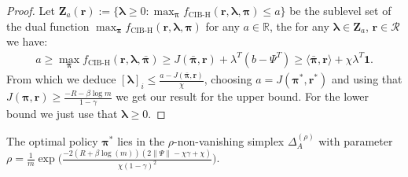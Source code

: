 \begin{proof}
    Let $\bm{Z}_a(\bm{r}) := \{ \bm{\lambda} \geq 0 : \max_{\bm{\pi}}f_\text{CIB-H}(\bm{r},\bm{\lambda},\bm{\pi}) \leq a \}$ be the sublevel set of the dual function $\max_{\bm{\pi}}f_\text{CIB-H}(\bm{r},\bm{\lambda},\bm{\pi})$ for any $a \in \mathbb{R}$, the for any $\bm{\lambda} \in \bm{Z}_a$, $\bm{r} \in \mathcal{R}$ we have:
    \begin{align*}
        a \geq \max_{\bm{\pi}}f_\text{CIB-H}(\bm{r},\bm{\lambda},\bar{\bm{\pi}}) \geq J( \bar{\bm{\pi}},\bm{r}) + \lambda^T (b - \Psi^T) \geq \langle \bar{\bm{\pi}},\bm{r}\rangle + \chi \lambda^T \mathbf{1}.
    \end{align*}
    From which we deduce $[\bm{\lambda}]_i \leq \frac{a-J( \bar{\bm{\pi}},\bm{r})}{\chi}$, choosing $a=J(\bm{\pi}^*,\bm{r}^*)$ and using that $J(\bm{\pi},\bm{r}) \geq \frac{-R -\beta \log m}{1-\gamma}$ we get our result for the upper bound. For the lower bound we just use that $\bm{\lambda} \geq 0$.
\end{proof}



\begin{proposition}
    \label{prop:optimal_solution_in_simplex} The optimal policy $\bm{\pi}^*$ lies in the $\rho$-non-vanishing simplex $\Delta_A^{(\rho)}$ with parameter $\rho = \frac{1}{m} \exp \Big(\frac{-2\left(R + \beta \log{\left(m \right)}\right) \left(2  \|\Psi\| - \chi \gamma + \chi\right)}{\chi \left(1- \gamma\right)^{2}} \Big)$.
\end{proposition}

